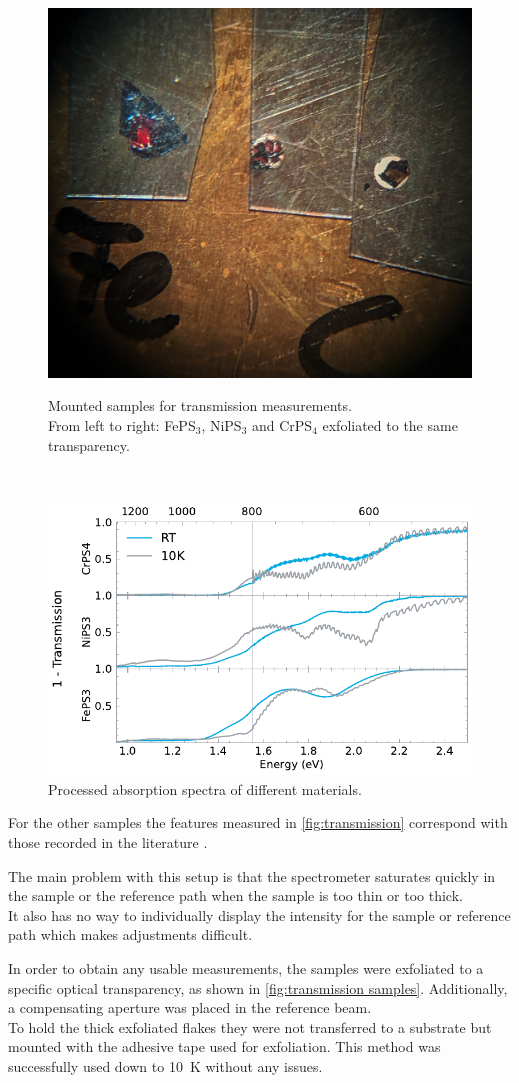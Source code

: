 \documentclass[
	oneside,
	parskip=half,
	a4paper,
]{scrbook}
\begin{document}
\begin{figure}
	\includegraphics[width=.3\textwidth]{../../photos/transmission samples.jpg}
	\caption\\
	{Mounted samples for transmission measurements.\\
	From left to right: FePS$_3$, NiPS$_3$ and CrPS$_4$ exfoliated to the same transparency.}
	\label{fig:transmission samples}
\end{figure}
\begin{figure}[b]
	\centering
	\includegraphics{../figures/2024-03-15 Absorbance.pdf}
	\caption{Processed absorption spectra of different materials.}
	\label{fig:transmission}
\end{figure}
For the other samples the features measured in \autoref{fig:transmission} correspond with those recorded in the literature \cite{CrPS4_transmission, NiPS3_transmission, FePS3_transmission}.

The main problem with this setup is that the spectrometer saturates quickly in the sample or the reference path when the sample is too thin or too thick.\\
It also has no way to individually display the intensity for the sample or reference path which makes adjustments difficult.

In order to obtain any usable measurements, the samples were exfoliated to a specific optical transparency, as shown in \autoref{fig:transmission samples}.
Additionally, a compensating aperture was placed in the reference beam.\\
To hold the thick exfoliated flakes they were not transferred to a substrate but mounted with the adhesive tape used for exfoliation. 
This method was successfully used down to \SI{10}{K} without any issues.
\end{document}
